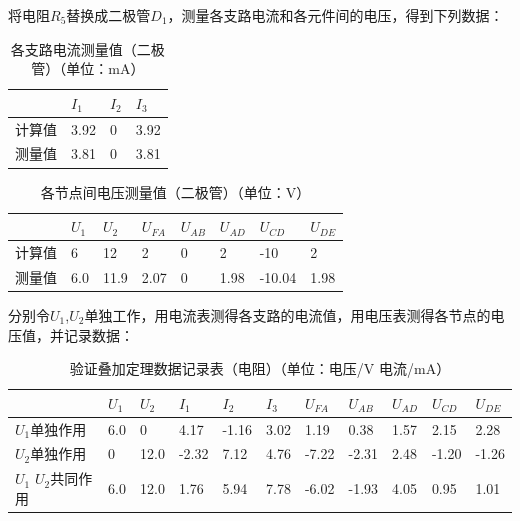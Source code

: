 \documentclass[12pt,a4paper]{article}
\begin{document}
将电阻$R_{5}$替换成二极管$D_{1}$，测量各支路电流和各元件间的电压，得到下列数据：

\begin{table}[H]
\centering
\caption{各支路电流测量值（二极管）（单位：mA）} 
\renewcommand{\arraystretch}{1.2}
\small
\begin{tabular}{|p{1.5cm}|p{1.3cm}|p{1.3cm}|p{1.3cm}|}
\hline
& $I_{1}$ & $I_{2}$ & $I_{3}$ \\
\hline
计算值 &3.92 &0 &3.92 \\
\hline
测量值 &3.81 &0 &3.81 \\
\hline
\end{tabular}

\end{table}



\begin{table}[H]
\centering
\caption{各节点间电压测量值（二极管）（单位：V）} 
\renewcommand{\arraystretch}{1.2}
\small
\begin{tabular}{|p{1.3cm}|p{1.1cm}|p{1.1cm}|p{1.1cm}|p{1.1cm}|p{1.1cm}|p{1.1cm}|p{1.1cm}|}
\hline
& $U_{1}$ & $U_{2}$ & $U_{FA}$ & $U_{AB}$ & $U_{AD}$ & $U_{CD}$ & $U_{DE}$ \\
\hline
计算值 &6 &12 &2 &0 &2 &-10 &2 \\
\hline
测量值 &6.0 &11.9 &2.07 &0 &1.98 &-10.04 & 1.98\\
\hline
\end{tabular}

\end{table}

分别令$U_{1}$,$U_{2}$单独工作，用电流表测得各支路的电流值，用电压表测得各节点的电压值，并记录数据：

\begin{table}[H]
\centering
\caption{验证叠加定理数据记录表（电阻）（单位：电压/V 电流/mA）} 
\renewcommand{\arraystretch}{1.2}
\footnotesize
\begin{tabular}{|p{2.6cm}|p{1cm}|p{1cm}|p{1cm}|p{1cm}|p{1cm}|p{1cm}|p{1cm}|p{1.0cm}|p{1cm}|p{1cm}|}
\hline
 & $U_{1}$ & $U_{2}$ & $I_{1}$ & $I_{2}$ & $I_{3}$ & $U_{FA}$ & $U_{AB}$ & $U_{AD}$ & $U_{CD}$ & $U_{DE}$ \\
\hline
$U_{1}$单独作用 &6.0 &0 &4.17 &-1.16 &3.02 &1.19 &0.38 &1.57 &2.15 &2.28 \\
\hline
$U_{2}$单独作用 &0 &12.0 &-2.32 &7.12 &4.76 &-7.22 &-2.31 &2.48 &-1.20 &-1.26 \\
\hline
$U_{1}$ $U_{2}$共同作用 &6.0 &12.0 &1.76 &5.94 &7.78 &-6.02 &-1.93 &4.05 &0.95 &1.01 \\
\hline
\end{tabular}

\end{table}
\end{document}
